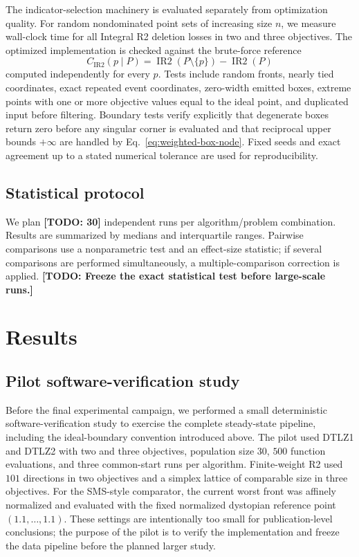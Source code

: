 \documentclass[runningheads]{llncs}
\newcommand{\IR}{\operatorname{IR2}}
\newcommand{\todo}[1]{\textcolor{red!70!black}{\textbf{[TODO: #1]}}}
\newcommand{\cIR}{C_{\IR}}
\begin{document}
The indicator-selection machinery is evaluated separately from optimization quality. For random nondominated point sets of increasing size $n$, we measure wall-clock time for all Integral R2 deletion losses in two and three objectives. The optimized implementation is checked against the brute-force reference
\begin{equation}
    \cIR(p\mid P)=\IR(P\setminus\{p\})-\IR(P)
\end{equation}
computed independently for every $p$. Tests include random fronts, nearly tied coordinates, exact repeated event coordinates, zero-width emitted boxes, extreme points with one or more objective values equal to the ideal point, and duplicated input before filtering. Boundary tests verify explicitly that degenerate boxes return zero before any singular corner is evaluated and that reciprocal upper bounds $+\infty$ are handled by Eq.~\eqref{eq:weighted-box-node}. Fixed seeds and exact agreement up to a stated numerical tolerance are used for reproducibility.

\subsection{Statistical protocol}

We plan \todo{30} independent runs per algorithm/problem combination. Results are summarized by medians and interquartile ranges. Pairwise comparisons use a nonparametric test and an effect-size statistic; if several comparisons are performed simultaneously, a multiple-comparison correction is applied. \todo{Freeze the exact statistical test before large-scale runs.}

\section{Results}
\label{sec:results}

\subsection{Pilot software-verification study}

Before the final experimental campaign, we performed a small deterministic software-verification study to exercise the complete steady-state pipeline, including the ideal-boundary convention introduced above.  The pilot used DTLZ1 and DTLZ2 with two and three objectives, population size $30$, $500$ function evaluations, and three common-start runs per algorithm.  Finite-weight R2 used $101$ directions in two objectives and a simplex lattice of comparable size in three objectives.  For the SMS-style comparator, the current worst front was affinely normalized and evaluated with the fixed normalized dystopian reference point $(1.1,\ldots,1.1)$.  These settings are intentionally too small for publication-level conclusions; the purpose of the pilot is to verify the implementation and freeze the data pipeline before the planned larger study.
\end{document}
